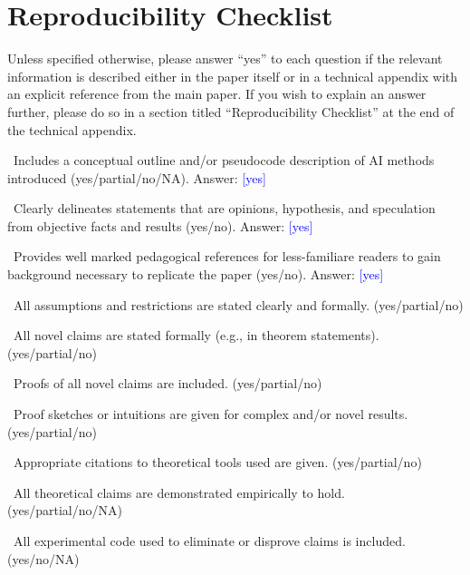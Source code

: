 \newpage

\section*{Reproducibility Checklist}

Unless specified otherwise, please answer “yes” to each question if the relevant information is described either in the paper itself or in a technical appendix with an explicit reference from the main paper. If you wish to explain an answer further, please do so in a section titled “Reproducibility Checklist” at the end of the technical appendix.


\textbullet  \  Includes a conceptual outline and/or pseudocode description of AI methods introduced (yes/partial/no/NA). Answer: \textcolor{blue}{[yes]}

\textbullet  \ Clearly delineates statements that are opinions, hypothesis, and speculation from objective facts and results (yes/no). Answer: \textcolor{blue}{[yes]}

\textbullet  \ Provides well marked pedagogical references for less-familiare readers to gain background necessary to replicate the paper (yes/no). Answer: \textcolor{blue}{[yes]}

\vspace{8pt}



\textbullet  \ All assumptions and restrictions are stated clearly and formally. (yes/partial/no)

\textbullet  \ All novel claims are stated formally (e.g., in theorem statements). (yes/partial/no)

\textbullet  \ Proofs of all novel claims are included. (yes/partial/no)

\textbullet  \ Proof sketches or intuitions are given for complex and/or novel results. (yes/partial/no)

\textbullet  \ Appropriate citations to theoretical tools used are given. (yes/partial/no)

\textbullet  \ All theoretical claims are demonstrated empirically to hold. (yes/partial/no/NA)

\textbullet  \ All experimental code used to eliminate or disprove claims is included. (yes/no/NA)

